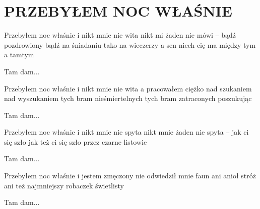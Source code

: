 \documentclass[../../../songbook.tex]{subfiles}
\begin{document}
\TabPositions{8cm} %
\section*{PRZEBYŁEM NOC WŁAŚNIE}
{}
\vspace{0.5cm}
Przebyłem noc właśnie i nikt mnie nie wita 	 \newline
nikt mi żaden nie mówi – bądź pozdrowiony 	 \newline
bądź na śniadaniu tako na wieczerzy 		 \newline
a sen niech cię ma między tym a tamtym 		 \newline

\-\hspace{1cm} Tam dam...  \newline

Przebyłem noc właśnie i nikt mnie nie wita 		\newline
a pracowałem ciężko nad szukaniem 		\newline
nad wyszukaniem tych bram nieśmiertelnych 		\newline
tych bram zatraconych poszukując 		\newline

\-\hspace{1cm} Tam dam... 

Przebyłem noc właśnie i nikt mnie nie spyta 		\newline
nikt mnie żaden nie spyta – jak ci się szło 		\newline
jak też ci się szło przez czarne listowie 		\newline

\-\hspace{1cm} Tam dam... 		\newline

Przebyłem noc właśnie i jestem zmęczony		\newline
nie odwiedził mnie faun ani anioł stróż		\newline
ani też najmniejszy robaczek świetlisty		\newline

\-\hspace{1cm} Tam dam... 		\newline
\end{document}
